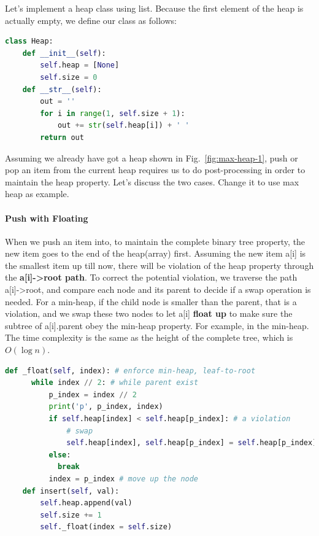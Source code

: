 \documentclass[main.tex]{subfiles}
\begin{document}
Let's implement a heap class using list. Because the first element of the heap is actually empty, we define our class as follows:
\begin{lstlisting}[language=Python]
class Heap:
    def __init__(self):
        self.heap = [None]
        self.size = 0
    def __str__(self):
        out = ''
        for i in range(1, self.size + 1):
            out += str(self.heap[i]) + ' '
        return out
\end{lstlisting}
Assuming we already have got a heap shown in Fig.~\ref{fig:max-heap-1}, push or pop an item from the current heap requires us to do post-processing in order to maintain the heap property. Let's discuss the two cases. Change it to use max heap as example.

\paragraph{Push with Floating} When we push an item into, to maintain the complete binary tree property, the new item goes to the end of the heap(array) first. Assuming the new item a[i] is the smallest item up till now, there will be violation of the heap property through the \textbf{a[i]->root path}. To correct the potential violation, we traverse the path a[i]->root, and compare each node and its parent  to decide if a swap operation is needed. For a min-heap, if the child node is smaller than the parent, that is a violation, and we swap these two nodes to let a[i] \textbf{float up} to make sure the subtree of a[i].parent obey the min-heap property.  For example, in the min-heap.  The time complexity is the same as the height of the complete tree, which is $O(\log n)$.
\begin{lstlisting}[language=Python]
    def _float(self, index): # enforce min-heap, leaf-to-root
      while index // 2: # while parent exist
          p_index = index // 2
          print('p', p_index, index)
          if self.heap[index] < self.heap[p_index]: # a violation
              # swap
              self.heap[index], self.heap[p_index] = self.heap[p_index], self.heap[index]
          else:
            break
          index = p_index # move up the node
    def insert(self, val):
        self.heap.append(val)
        self.size += 1
        self._float(index = self.size)
\end{lstlisting}
\end{document}

